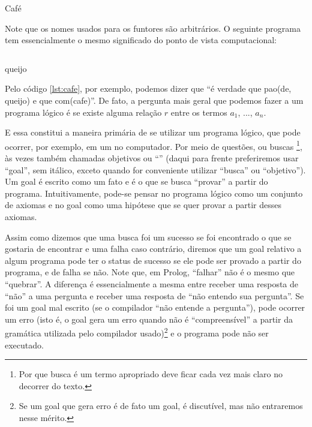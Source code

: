     \begin{listing}
\inputminted{prolog}{../Exemplos/Cap0/prog1_cafe.pl}
    \caption{Café}\label{lst:cafe}
    \end{listing}

Note que os nomes usados para os funtores são arbitrários. O seguinte programa tem essencialmente o mesmo significado do ponto de vista computacional:\\

%
    \begin{listing}
\inputminted{prolog}{../Exemplos/Cap0/prog2_queijo.pl}
\caption{queijo}\label{lst:queijo}
    \end{listing}

Pelo código \ref{lst:cafe}, por exemplo, podemos dizer que ``é verdade que pao(de, queijo) e que com(cafe)''. De fato, a pergunta mais
geral que podemos fazer a um programa lógico é se existe alguma relação $r$ entre os termos $a_1$, ..., $a_n$.

E essa constitui a maneira primária de se utilizar um programa lógico, que pode ocorrer, por
exemplo, em um  no computador. Por meio de questões, ou buscas \footnote{Por que
  busca é um termo apropriado deve ficar cada vez mais claro no decorrer do texto.}, às vezes também
chamadas objetivos ou ``'' (daqui para frente preferiremos usar ``goal'', sem
itálico, exceto quando for conveniente utilizar ``busca'' ou ``objetivo''). Um goal é escrito como
um fato e é o que se busca ``provar'' a partir do programa. Intuitivamente, pode-se pensar no
programa lógico como um conjunto de axiomas e no goal como uma hipótese que se quer provar a partir desses axiomas.

Assim como dizemos que uma busca foi um sucesso se foi encontrado o que se gostaria de encontrar e uma falha caso contrário,
diremos que um goal relativo a algum programa pode ter o status de sucesso se ele pode ser provado a partir do programa, e de
falha se não. Note que, em Prolog, ``falhar'' não é o mesmo que ``quebrar''. A diferença é
essencialmente a mesma entre receber uma resposta de ``não'' a uma pergunta e receber uma resposta de
``não entendo sua pergunta''.  Se foi um goal mal escrito (se o compilador ``não entende a
pergunta''), pode ocorrer um erro (isto é, o goal gera um erro quando não é ``compreensível'' a
partir da gramática utilizada pelo compilador usado)\footnote{Se um goal que gera erro é de fato um
  goal, é discutível, mas não entraremos nesse mérito.} e o programa pode não ser executado.

